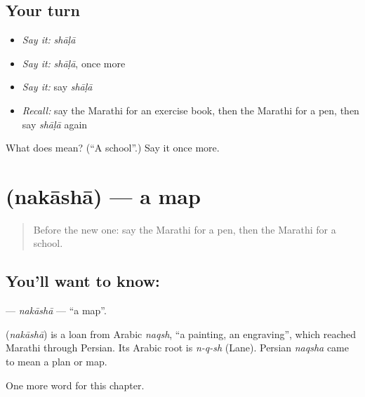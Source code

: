 \subsection*{Your turn}
\begin{itemize}
\raggedright
  \item \emph{Say it:} \emph{shāḷā}
  \item \emph{Say it:} \emph{shāḷā}, once more
  \item \emph{Say it:} say \emph{shāḷā}
  \item \emph{Recall:} say the Marathi for an exercise book, then the Marathi for a pen, then say \emph{shāḷā} again
\end{itemize}

\begin{tcolorbox}[breakable,colback=teal!4,colframe=teal!35!black,title={Before you move on}]
What does  mean? (\textquotedblleft{}A school\textquotedblright{}.) Say it once more.
\end{tcolorbox}
\section[\texorpdfstring{\mr{नकाशा} (nakāshā)}{नकाशा (nakāshā)}]{ (nakāshā) — a map}

\label{lesson:MR-C94-nakasha}



\begin{quote}
Before the new one: say the Marathi for a pen, then the Marathi for a school.
\end{quote}

\subsection*{You'll want to know: }
\textbf{} — \emph{nakāshā} — \textquotedblleft{}a map\textquotedblright{}.

\begin{cousinweb}
\textbf{} (\emph{nakāshā}) is a loan from Arabic \emph{naqsh}, \textquotedblleft{}a painting, an engraving\textquotedblright{}, which reached Marathi through Persian. Its Arabic root is \emph{n-q-sh} (Lane). Persian \emph{naqsha} came to mean a plan or map.
\end{cousinweb}

\begin{grammarlens}[title={What you've built}]
One more word for this chapter.
\end{grammarlens}

